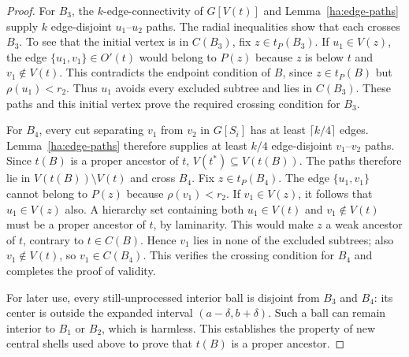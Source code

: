 \documentclass[11pt]{amsart}
\theoremstyle{definition}
\theoremstyle{remark}
\numberwithin{equation}{section}
\begin{document}
\begin{proof}
For $B_3$, the $k$-edge-connectivity of $G[V(t)]$ and
Lemma~\ref{ha:edge-paths} supply $k$ edge-disjoint $u_1$--$u_2$ paths.
The radial inequalities show that
each crosses $B_3$.  To see that the initial vertex is in $C(B_3)$,
fix $z\in t_P(B_3)$.  If $u_1\in V(z)$, the edge
$\{u_1,v_1\}\in O'(t)$ would belong to $P(z)$ because $z$ is below
$t$ and $v_1\notin V(t)$.  This contradicts the endpoint condition of
$B$, since $z\in t_P(B)$ but $\rho(u_1)<r_2$.  Thus $u_1$ avoids
every excluded subtree and lies in $C(B_3)$.  These paths and this
initial vertex prove the required crossing condition for $B_3$.

For $B_4$, every cut separating $v_1$ from $v_2$ in $G[S_i]$ has
at least $\lceil k/4\rceil$ edges.  Lemma~\ref{ha:edge-paths}
therefore supplies at least $k/4$ edge-disjoint $v_1$--$v_2$ paths.
Since $t(B)$ is a proper
ancestor of $t$, $V(t^*)\subseteq V(t(B))$.  The paths therefore lie
in $V(t(B))\setminus V(t)$ and cross $B_4$.  Fix $z\in t_P(B_4)$.
The edge $\{u_1,v_1\}$ cannot belong to $P(z)$ because
$\rho(v_1)<r_2$.  If $v_1\in V(z)$, it follows that $u_1\in V(z)$
also.  A hierarchy set containing both $u_1\in V(t)$ and
$v_1\notin V(t)$ must be a proper ancestor of $t$, by laminarity.
This would make $z$ a weak ancestor of $t$, contrary to $t\in C(B)$.
Hence $v_1$ lies in none of the excluded subtrees; also
$v_1\notin V(t)$, so $v_1\in C(B_4)$.  This verifies the crossing
condition for $B_4$ and completes the proof of validity.

For later use, every still-unprocessed interior ball is disjoint from
$B_3$ and $B_4$: its center is outside the expanded interval
$(a-\delta,b+\delta)$.  Such a ball can remain interior to $B_1$ or
$B_2$, which is harmless.  This establishes the property of new
central shells used above to prove that $t(B)$ is a proper ancestor.


\end{proof}
\end{document}
